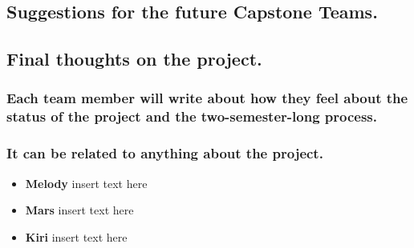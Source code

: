 \documentclass[12pt, letterpaper]{article}
\begin{document}
\subsection{Suggestions for the future Capstone Teams.}

\subsection{Final thoughts on the project.}
\subsubsection{Each team member will write about how they feel about the status of the project and the two-semester-long process.}
\subsubsection{It can be related to anything about the project.}
\begin{itemize}
	\item{\textbf{Melody}}
		insert text here
	\item{\textbf{Mars}}
		insert text here
	\item{\textbf{Kiri}}
		insert text here
\end{itemize}
\end{document}
